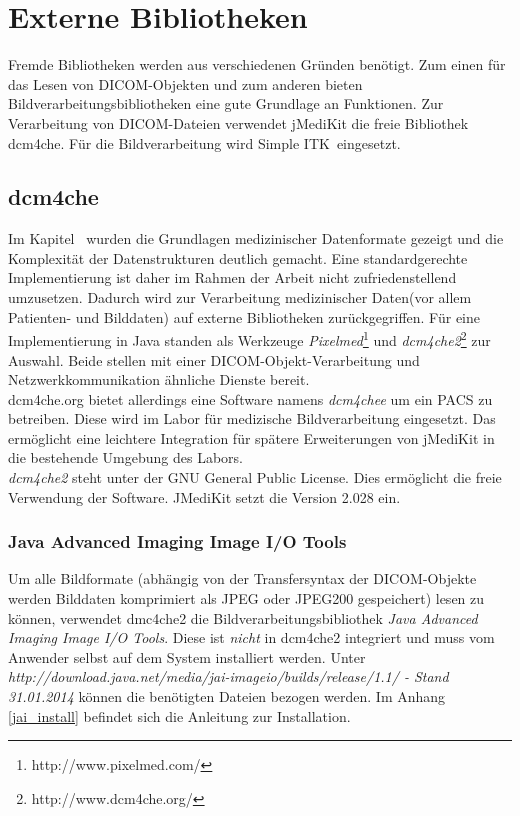 \FloatBarrier
\section{Externe Bibliotheken}

Fremde Bibliotheken werden aus verschiedenen Gründen benötigt. Zum einen für das Lesen von DICOM-Objekten und zum anderen bieten Bildverarbeitungsbibliotheken eine gute Grundlage an Funktionen. Zur Verarbeitung von DICOM-Dateien verwendet jMediKit die freie Bibliothek \glqq dcm4che\grqq. Für die Bildverarbeitung wird \glqq Simple ITK\grqq\ eingesetzt.

\FloatBarrier
\subsection{dcm4che}
Im Kapitel \glqq {}\grqq\ wurden die Grundlagen medizinischer Datenformate gezeigt und die Komplexität der Datenstrukturen deutlich gemacht. Eine standardgerechte Implementierung ist daher im Rahmen der Arbeit nicht zufriedenstellend umzusetzen. Dadurch wird zur Verarbeitung medizinischer Daten(vor allem Patienten- und Bilddaten) auf externe Bibliotheken zurückgegriffen. Für eine Implementierung in Java standen als Werkzeuge  \textit{Pixelmed}\footnote{http://www.pixelmed.com/} und \textit{dcm4che2}\footnote{http://www.dcm4che.org/} zur Auswahl. Beide stellen mit einer DICOM-Objekt-Verarbeitung und Netzwerkkommunikation ähnliche Dienste bereit.\\
dcm4che.org bietet allerdings eine Software namens \textit{dcm4chee} um ein PACS zu betreiben. Diese wird im Labor für medizische Bildverarbeitung eingesetzt. Das ermöglicht eine leichtere Integration für spätere Erweiterungen von jMediKit in die bestehende Umgebung des Labors.\\
\textit{dcm4che2} steht unter der GNU General Public License. Dies ermöglicht die freie Verwendung der Software. JMediKit setzt die Version 2.028 ein.

\FloatBarrier
\subsubsection{Java Advanced Imaging Image I/O Tools}
Um alle Bildformate (abhängig von der Transfersyntax der DICOM-Objekte werden Bilddaten komprimiert als JPEG oder JPEG200 gespeichert) lesen zu können, verwendet dmc4che2 die Bildverarbeitungsbibliothek \textit{Java Advanced Imaging Image I/O Tools}. Diese ist \textit{nicht} in dcm4che2 integriert und muss vom Anwender selbst auf dem System installiert werden. Unter \textit{http://download.java.net/media/jai-imageio/builds/release/1.1/ - Stand 31.01.2014} können die benötigten Dateien bezogen werden. Im Anhang \ref{jai_install} befindet sich die Anleitung zur Installation.

